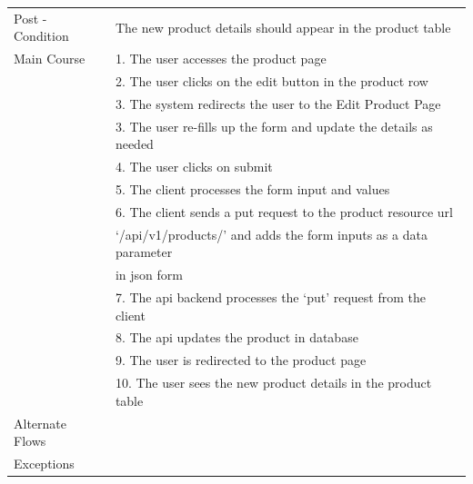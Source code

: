 \documentclass{report}
\begin{document}
\begin{tabular}{ l l }
Post - Condition 	& The new product details should appear in the product table \\ 
Main Course			& 1. The user accesses the product page \\
					& 2. The user clicks on the edit button in the product row \\
					& 3. The system redirects the user to the Edit Product Page \\
					& 3. The user re-fills up the form and update the details as needed \\
					& 4. The user clicks on submit \\
					& 5. The client processes the form input and values \\
					& 6. The client sends a put request to the product resource url \\ 
					& ‘/api/v1/products/’  and adds the form inputs as a data parameter \\ 
					& in json form \\
					& 7. The api backend processes the ‘put’ request from the client \\ 
					& 8. The api updates the product in database \\
					& 9. The user is redirected to the product page \\
					& 10. The user sees the new product details in the product table \\
Alternate Flows		& \\
Exceptions 			& \\

\end{tabular}
\newpage
\end{document}
